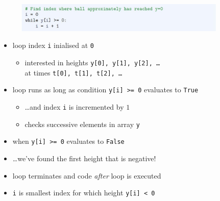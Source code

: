 \documentclass[english,14pt]{beamer}
\begin{document}
\begin{frame}[fragile]

\frametitle{}

\begin{figure}[ht]
	\centering
	\includegraphics[width=0.9\textwidth]{figures/LLp65b}
\end{figure}

\vspace*{-5mm}
\begin{itemize}
	\item loop index \texttt{i} inialised at \texttt{0}
	\begin{itemize}
		\item interested in heights \texttt{y[0], y[1], y[2], \ldots} \\ at times \texttt{t[0], t[1], t[2], \ldots}
	\end{itemize}
	\item loop runs as long as condition \texttt{y[i] >= 0} evaluates to \texttt{True}
	\begin{itemize}
		\item \ldots and index \texttt{i} is incremented by $1$
		\item checks successive elements in array \texttt{y}
	\end{itemize}
	\item when \texttt{y[i] >= 0} evaluates to \texttt{False}
	\item[] \ldots we've found the first height that is negative!
	\item loop terminates and code \emph{after} loop is executed
	\item \texttt{i} is smallest index for which height \texttt{y[i] < 0}

\end{itemize}

\end{frame}

\end{document}
